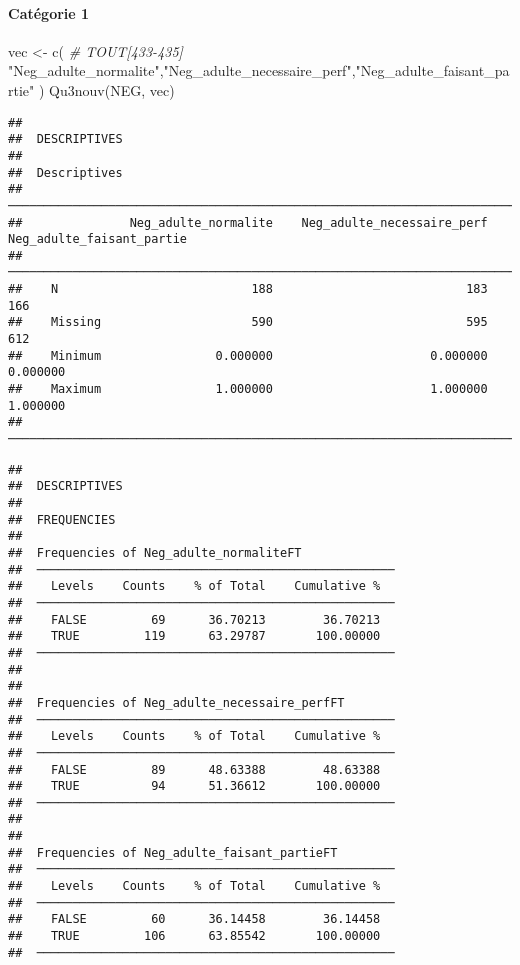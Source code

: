 \documentclass[
]{article}
\newenvironment{Shaded}{\begin{snugshade}}{\end{snugshade}}
\newcommand{\CommentTok}[1]{\textcolor[rgb]{0.56,0.35,0.01}{\textit{#1}}}
\newcommand{\FunctionTok}[1]{\textcolor[rgb]{0.00,0.00,0.00}{#1}}
\newcommand{\NormalTok}[1]{#1}
\newcommand{\OtherTok}[1]{\textcolor[rgb]{0.56,0.35,0.01}{#1}}
\newcommand{\StringTok}[1]{\textcolor[rgb]{0.31,0.60,0.02}{#1}}
\begin{document}
\hypertarget{catuxe9gorie-1-4}{%
\paragraph{Catégorie 1}\label{catuxe9gorie-1-4}}

\begin{Shaded}
\begin{Highlighting}[]
\NormalTok{vec }\OtherTok{\textless{}{-}} \FunctionTok{c}\NormalTok{(   }\CommentTok{\# TOUT[433{-}435]}
  \StringTok{"Neg\_adulte\_normalite"}\NormalTok{,}\StringTok{"Neg\_adulte\_necessaire\_perf"}\NormalTok{,}\StringTok{"Neg\_adulte\_faisant\_partie"}\NormalTok{ )}
\FunctionTok{Qu3nouv}\NormalTok{(NEG, vec)}
\end{Highlighting}
\end{Shaded}

\begin{verbatim}
## 
##  DESCRIPTIVES
## 
##  Descriptives                                                                                   
##  ────────────────────────────────────────────────────────────────────────────────────────────── 
##               Neg_adulte_normalite    Neg_adulte_necessaire_perf    Neg_adulte_faisant_partie   
##  ────────────────────────────────────────────────────────────────────────────────────────────── 
##    N                           188                           183                          166   
##    Missing                     590                           595                          612   
##    Minimum                0.000000                      0.000000                     0.000000   
##    Maximum                1.000000                      1.000000                     1.000000   
##  ──────────────────────────────────────────────────────────────────────────────────────────────
\end{verbatim}

\begin{verbatim}
## 
##  DESCRIPTIVES
## 
##  FREQUENCIES
## 
##  Frequencies of Neg_adulte_normaliteFT              
##  ────────────────────────────────────────────────── 
##    Levels    Counts    % of Total    Cumulative %   
##  ────────────────────────────────────────────────── 
##    FALSE         69      36.70213        36.70213   
##    TRUE         119      63.29787       100.00000   
##  ────────────────────────────────────────────────── 
## 
## 
##  Frequencies of Neg_adulte_necessaire_perfFT        
##  ────────────────────────────────────────────────── 
##    Levels    Counts    % of Total    Cumulative %   
##  ────────────────────────────────────────────────── 
##    FALSE         89      48.63388        48.63388   
##    TRUE          94      51.36612       100.00000   
##  ────────────────────────────────────────────────── 
## 
## 
##  Frequencies of Neg_adulte_faisant_partieFT         
##  ────────────────────────────────────────────────── 
##    Levels    Counts    % of Total    Cumulative %   
##  ────────────────────────────────────────────────── 
##    FALSE         60      36.14458        36.14458   
##    TRUE         106      63.85542       100.00000   
##  ──────────────────────────────────────────────────
\end{verbatim}
\end{document}
